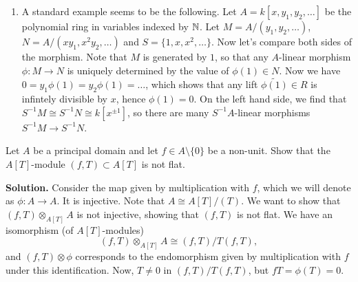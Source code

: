 \documentclass[a4paper,11pt]{article}
\begin{document}
\begin{enumerate}
\item A standard example seems to be the following. Let $A = k[x, y_1, y_2, \dots]$ be 
    the polynomial ring in variables indexed by $\mathbb{N}$. Let $M = A / (y_1, y_2, \dots)$,
    $N = A/(xy_1, x^2y_2, \dots)$ and $S = \{1,x,x^2,\dots\}$. Now let's compare both 
    sides of the morphism. Note that $M$ is generated by $1$, so that any
    $A$-linear morphism $\phi: M \to N$ is uniquely determined by the value of
    $\phi(1) \in N$. Now we have $0 = y_1 \phi(1) = y_2 \phi(1) = \dots$, which shows
    that any lift $\tilde{\phi(1)} \in R$ is infintely divisible by $x$, hence 
    $\phi(1) = 0$. On the left hand side, we find that
    $S^{-1} M \cong S^{-1}N \cong k[x^{\pm 1}]$, so there are many $S^{-1}A$-linear
    morphisms $S^{-1} M \to S^{-1}N$. 
\end{enumerate}

Let $A$ be a principal domain and let $f \in A \setminus \{0\}$ be a 
non-unit. Show that the $A[T]$-module $(f,T) \subset A[T]$ is not flat. 

\textbf{Solution.}
Consider the map given by multiplication with $f$, which we will 
denote as $\phi: A \to A$. It is injective. Note that $A \cong A[T]/(T)$. 
We want to show that $(f,T) \otimes_{A[T]} A$ is not injective, 
showing that $(f,T)$ is not flat. We have an isomorphism (of $A[T]$-modules)
$$(f,T) \otimes_{A[T]} A \cong (f,T) / T (f,T),$$
and $(f,T) \otimes \phi$ corresponds to the endomorphism given by multiplication
with $f$ under this identification.
Now, $T \neq 0$ in $(f,T)/T(f,T)$, but $fT = \phi(T) = 0$. 

\contactend
\end{document}
